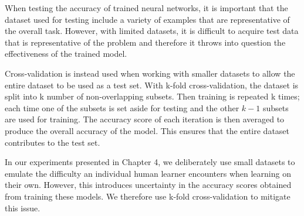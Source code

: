 When testing the accuracy of trained neural networks, it is important that the dataset used for testing include a variety of examples that are representative of the overall task. However, with limited datasets, it is difficult to acquire test data that is representative of the problem and therefore it throws into question the effectiveness of the trained model\cite{Goodfellow-et-al-2016}.

Cross-validation is instead used when working with smaller datasets to allow the entire dataset to be used as a test set. With k-fold cross-validation, the dataset is split into k number of non-overlapping subsets. Then training is repeated k times; each time one of the subsets is set aside for testing and the other $k-1$ subsets are used for training. The accuracy score of each iteration is then averaged to produce the overall accuracy of the model. This ensures that the entire dataset contributes to the test set\cite{Goodfellow-et-al-2016}.

In our experiments presented in Chapter 4, we deliberately use small datasets to emulate the difficulty an individual human learner encounters when learning on their own. However, this introduces uncertainty in the accuracy scores obtained from training these models\cite{Goodfellow-et-al-2016}. We therefore use k-fold cross-validation to mitigate this issue.